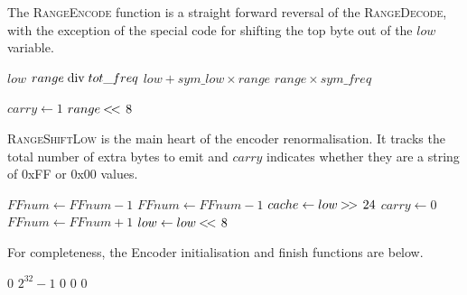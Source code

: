 \documentclass[a4paper]{article}
\begin{document}
The \textsc{RangeEncode} function is a straight forward reversal of the \textsc{RangeDecode}, with the exception of the special code for shifting the top byte out of the $low$ variable.

\begin{algorithmic}[1]
  \settowidth{\maxwidth}{old\_low\ }
  \State {} $low$
  \State {} $range \bdiv tot\_freq$
  \State {} $low + sym\_low \times range$
  \State {} $range \times sym\_freq$

  \Statex
    \State $carry \gets 1$ 
  \EndIf
   
    \settowidth{\maxwidth}{range\ }
    \State {} $range \mathbin{<\mkern-3mu<\,} 8$
    \State {}
  \EndWhile
\EndProcedure
\end{algorithmic}

\textsc{RangeShiftLow} is the main heart of the encoder renormalisation.
It tracks the total number of extra bytes to emit and $carry$ indicates whether they are a string of 0xFF or 0x00 values.

\begin{algorithmic}[1]
      \State {} 
        \State {}
        \State $FFnum \gets FFnum - 1$
      \EndWhile
    \Else
      \State {} 
        \State {}
        \State $FFnum \gets FFnum - 1$
      \EndWhile
    \EndIf
    \State $cache \gets low \mathbin{>\mkern-3mu>\,} 24$ 
    \State $carry \gets 0$
  \Else
    \State $FFnum \gets FFnum + 1$
  \EndIf
  \Statex
  \State $low \gets low \mathbin{<\mkern-3mu<\,} 8$
\EndProcedure
\end{algorithmic}

For completeness, the Encoder initialisation and finish functions are below.

\begin{algorithmic}[1]
  \settowidth{\maxwidth}{FFnum\ }
  \State {} $0$
  \State {} $2^{32}-1$
  \State {} $0$
  \State {} $0$
  \State {} $0$
\EndProcedure
\end{algorithmic}
\end{document}
